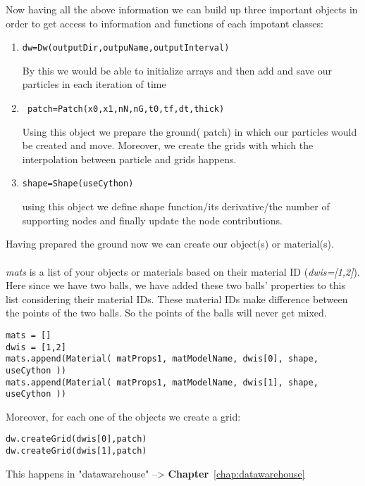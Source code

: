 \documentclass[11pt,fleqn]{book} %
\begin{document}
Now having all the above information we can build up three important objects in order to get access to information and functions of each impotant classes:

\begin{enumerate}

\item \begin{lstlisting}
dw=Dw(outputDir,outpuName,outputInterval)                                   
\end{lstlisting}
By this we would be able to initialize arrays and then add and save our particles in each iteration of time

\item \begin{lstlisting}
 patch=Patch(x0,x1,nN,nG,t0,tf,dt,thick)   
\end{lstlisting}
Using this object we prepare the ground( patch) in which our particles would be created and move. Moreover, we create the grids with which the interpolation between particle and grids happens.
\item \begin{lstlisting}
shape=Shape(useCython)                                
\end{lstlisting}
using this object we define shape function/its derivative/the number of supporting nodes and finally update the node contributions. 

\end{enumerate}

Having prepared the ground now we can create our object(s) or material(s).\\ \\
\emph{mats} is a list of your objects or materials based on their material ID (\emph{dwis=[1,2]}). Here since we have two balls, we have added these two balls' properties to this list considering their material IDs. These material IDs make difference between the points of the two balls. So the points of the balls will never get mixed.
\begin{lstlisting}
mats = []    
dwis = [1,2]    
mats.append(Material( matProps1, matModelName, dwis[0], shape, useCython ))
mats.append(Material( matProps1, matModelName, dwis[1], shape, useCython ))
\end{lstlisting}

Moreover, for each one of the objects we create a grid:
\begin{lstlisting}
dw.createGrid(dwis[0],patch)
dw.createGrid(dwis[1],patch)
\end{lstlisting}
This happens in "datawarehouse" --> \textbf{Chapter}~\ref{chap:datawarehouse} \\ \\
\end{document}
